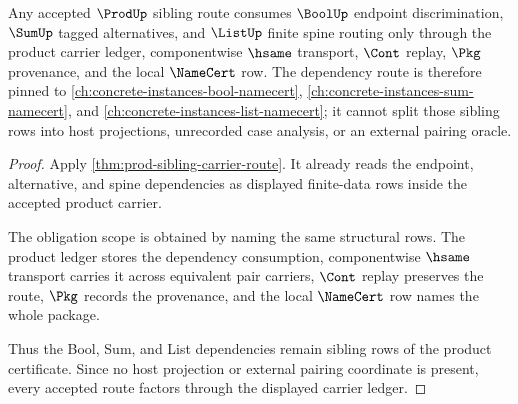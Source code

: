 \begin{theorem}
\label{thm:prod-sibling-carrier-route-obligation-scope}
Any accepted $\ProdUp$ sibling route consumes $\BoolUp$ endpoint discrimination, $\SumUp$ tagged alternatives, and $\ListUp$ finite spine routing only through the product carrier ledger, componentwise $\hsame$ transport, $\Cont$ replay, $\Pkg$ provenance, and the local $\NameCert$ row. The dependency route is therefore pinned to \autoref{ch:concrete-instances-bool-namecert}, \autoref{ch:concrete-instances-sum-namecert}, and \autoref{ch:concrete-instances-list-namecert}; it cannot split those sibling rows into host projections, unrecorded case analysis, or an external pairing oracle.
\end{theorem}
\begin{proof}
Apply \autoref{thm:prod-sibling-carrier-route}. It already reads the endpoint, alternative, and spine dependencies as displayed finite-data rows inside the accepted product carrier.

The obligation scope is obtained by naming the same structural rows. The product ledger stores the dependency consumption, componentwise $\hsame$ transport carries it across equivalent pair carriers, $\Cont$ replay preserves the route, $\Pkg$ records the provenance, and the local $\NameCert$ row names the whole package.

Thus the Bool, Sum, and List dependencies remain sibling rows of the product certificate. Since no host projection or external pairing coordinate is present, every accepted route factors through the displayed carrier ledger.
\end{proof}

